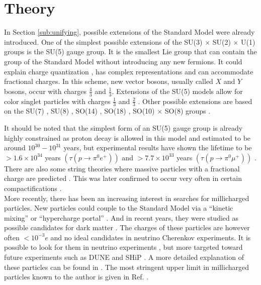 \section{Theory}
In Section \ref{sub:unifying}, possible extensions of the Standard Model were already introduced. One of the simplest possible extensions of the SU(3) $\times$ SU(2) $\times$ U(1) groups is the SU(5) gauge group. It is the smallest Lie group that can contain the group of the Standard Model without introducing any new fermions. It could explain charge quantization \cite{He:1989eq}, has complex representations and can accommodate fractional charges. In this scheme, new vector bosons, usually called $X$ and $Y$ bosons, occur with charges $\frac{4}{3}$ and $\frac{1}{3}$. Extensions of the SU(5) models allow for color singlet particles with charges $\frac{1}{3}$ and $\frac{2}{3}$ \cite{Barr:1982vj}. Other possible extensions are based on the SU(7) \cite{Frampton:1982gc}, SU(8) \cite{Yu:1984pb}, SO(14) \cite{Yamamoto:1982sk}, SO(18) \cite{Dong:1983nh}, SO(10) $\times$ SO(8) groups \cite{Jiang:1985jy}. 

It should be noted that the simplest form of an SU(5) gauge group is already highly constrained as proton decay is allowed in this model and estimated to be around $10^{30}-10^{31}$ years, but experimental results have shown the lifetime to be $>1.6 \times 10^{34}$ years $\left(\tau\left(p \rightarrow \pi^0 e^+\right)\right)$ and $>7.7 \times 10^{33}$ years $\left(\tau\left(p \rightarrow \pi^0 \mu^+\right)\right)$ \cite{Miura:2016krn}.\\
\newline
There are also some string theories where massive particles with a fractional charge are predicted \cite{Wen:1985qj,Antoniadis:1992eb}. This was later confirmed to occur very often in certain compactifications \cite{Athanasiu:1988uj}.\\

\noindent More recently, there has been an increasing interest in searches for millicharged particles. New particles could couple to the Standard Model via a ``kinetic mixing'' or ``hypercharge portal'' \cite{Holdom:1985ag,Izaguirre:2015eya}. And in recent years, they were studied as possible candidates for dark matter \cite{Brahm:1989jh,Boehm:2003hm,Pospelov:2007mp,Bjorken:2009mm}. The charges of these particles are however often $<10^{-3}e$ and no ideal candidates in neutrino Cherenkov experiments. It is possible to look for them in neutrino experiments \cite{Magill:2018tbb}, but more targeted toward future experiments such as DUNE \cite{Acciarri:2015uup} and SHiP \cite{Anelli:2015pba}. A more detailed explanation of these particles can be found in \cite{Battaglieri:2017aum}. The most stringent upper limit in millicharged particles known to the author is given in Ref. \cite{Alvis:2018yte}.

